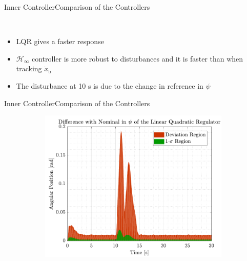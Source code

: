 \begin{frame}{Inner Controller}{Comparison of the Controllers}
\begin{figure}[H]
\begin{minipage}{0.45\linewidth}
\begin{figure}[H]
      \end{figure}                
    \end{minipage}\hfill \\
  \end{figure}
    \begin{itemize}
        \item LQR gives a faster response
        \item $\mathcal{H}_\infty$ controller is more robust to disturbances and it is faster than when tracking $\dot{x}_\mathrm{b}$
        \item The disturbance at 10 s is due to the change in reference in $\psi$
    \end{itemize}
\end{frame}

\begin{frame}{Inner Controller}{Comparison of the Controllers}
  \begin{figure}[H]
    \begin{minipage}{0.45\linewidth}
      \begin{figure}[H]
        \centering
        \includegraphics[width=1\linewidth]{figures/yaw_mc_lqr_error}
      \end{figure}        
    \end{minipage}\hfill      
    \begin{minipage}{0.45\linewidth}
      \begin{figure}[H]
        \centering

\end{figure}
\end{minipage}
\end{figure}
\end{frame}
